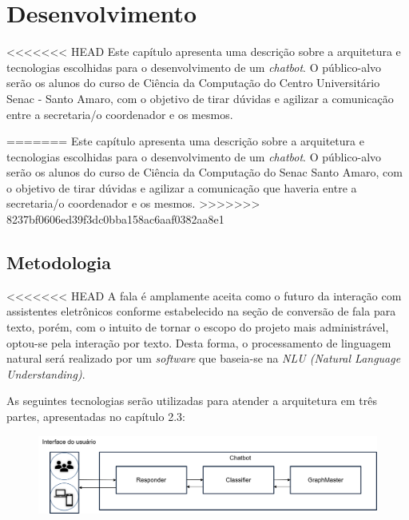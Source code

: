 \documentclass[
	12pt,				%
	oneside,
	a4paper,			%
	english,			%
	french,				%
	spanish,			%
	brazil				%
	]{abntex2}
\begin{document}

\chapter{Desenvolvimento}

<<<<<<< HEAD
Este capítulo apresenta uma descrição sobre a arquitetura e tecnologias escolhidas para o desenvolvimento de um \emph{chatbot}. O público-alvo serão os alunos do curso de Ciência da Computação do Centro Universitário Senac - Santo Amaro, com o objetivo de tirar dúvidas e agilizar a comunicação entre a secretaria/o coordenador e os mesmos.

=======
Este capítulo apresenta uma descrição sobre a arquitetura e tecnologias escolhidas para o desenvolvimento de um \emph{chatbot}. O público-alvo serão os alunos do curso de Ciência da Computação do Senac Santo Amaro, com o objetivo de tirar dúvidas e agilizar a comunicação que haveria entre a secretaria/o coordenador e os mesmos.
>>>>>>> 8237bf0606ed39f3dc0bba158ac6aaf0382aa8e1

\section{Metodologia}

<<<<<<< HEAD
A fala é amplamente aceita como o futuro da interação com assistentes eletrônicos conforme estabelecido na seção de conversão de fala para texto, porém, com o intuito de tornar o escopo do projeto mais administrável, optou-se pela interação por texto. Desta forma, o processamento de linguagem natural será realizado por um \emph{software} que baseia-se na \emph{NLU (Natural Language Understanding)}.

As seguintes tecnologias serão utilizadas para atender a arquitetura em três partes, apresentadas no capítulo 2.3:

\begin{figure}[h]
\centering %
\includegraphics[width=15cm]{arquiturachatbot1.png} %
\label{figura:Linha histórica dos chatbots}
\end{figure}
\end{document}
